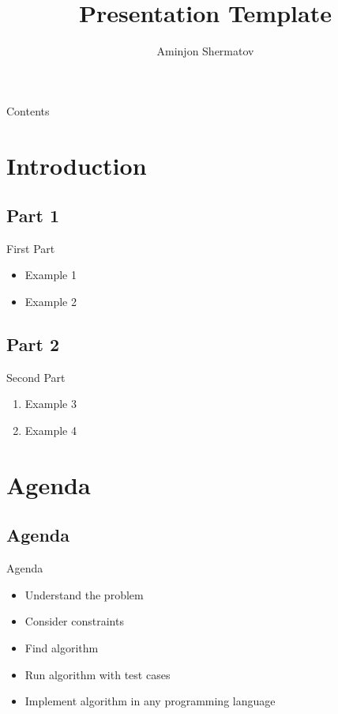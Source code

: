 \documentclass{beamer}
\begin{document}
    \title{Presentation Template}
    \author{Aminjon Shermatov}

    \begin{frame}
        \titlepage
    \end{frame}

    \begin{frame}{Contents}
        \doublespacing
        \tableofcontents
        \singlespacing
    \end{frame}

    \section{Introduction}

    \subsection{Part 1}
    \begin{frame}{First Part}
        \textit{\color{cyan}{First part of introduction}}
        \begin{itemize}
            \item Example 1
            \item Example 2
        \end{itemize}
    \end{frame}

    \subsection{Part 2}
    \begin{frame}{Second Part}
        \textbf{\color{blue}{Second part of introduction}}
        \begin{enumerate}
            \item Example 3
            \item Example 4
        \end{enumerate}
    \end{frame}


    \section{Agenda}

    \subsection{Agenda}
    \begin{frame}{Agenda}
        \begin{itemize}
            \item Understand the problem
            \item Consider constraints
            \item Find algorithm
            \item Run algorithm with test cases
            \item Implement algorithm in any programming language
        \end{itemize}
    \end{frame}
\end{document}
